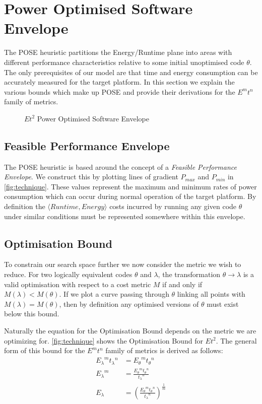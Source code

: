 \section{Power Optimised Software Envelope}
\label{sec:pose}
The POSE heuristic partitions the Energy/Runtime plane into areas with different performance characteristics relative to some initial unoptimised code $\theta$. The only prerequisites of our model are that time and energy consumption can be accurately measured for the target platform.
In this section we explain the various bounds which make up POSE and provide their derivations for the $E^mt^n$ family of metrics.

\begin{figure}
\centering

\caption{$Et^2$ Power Optimised Software Envelope}
\label{fig:technique}
\end{figure}

\subsection{Feasible Performance Envelope}
The POSE heuristic is based around the concept of a \emph{Feasible Performance Envelope}.
We construct this by plotting lines of gradient $P_{max}$ and $P_{min}$ in \autoref{fig:technique}.
These values represent the maximum and minimum rates of power consumption which can occur during normal operation of the target platform.
By definition the $\langle Runtime, Energy\rangle$ costs incurred by running any given code $\theta$ under similar conditions must be represented somewhere within this envelope.

\subsection{Optimisation Bound}
To constrain our search space further we now consider the metric we wish to reduce.
For two logically equivalent codes $\theta$ and $\lambda$, the transformation ${\theta \to \lambda}$ is a valid optimisation with respect to a cost metric $M$ if and only if ${M(\lambda) < M(\theta)}$.
If we plot a curve passing through $\theta$ linking all points with ${M(\lambda) = M(\theta)}$, then by definition any optimised versions of $\theta$ must exist below this bound.

Naturally the equation for the Optimisation Bound depends on the metric we are optimizing for.
\autoref{fig:technique} shows the Optimisation Bound for $Et^2$.
The general form of this bound for the $E^mt^n$ family of metrics is derived as follows:
\begin{align}
 {E_\lambda}^m{t_\lambda}^n &= {E_\theta}^m{t_\theta}^n \nonumber \\
 {E_\lambda}^m &= \frac{{E_\theta}^m{t_\theta}^n}{{t_\lambda}^n} \nonumber \\
  E_\lambda &= (\frac{{E_\theta}^m{t_\theta}^n}{{t_\lambda}^n})^\frac{1}{m}
\label{eq:optimisation}
\end{align}

